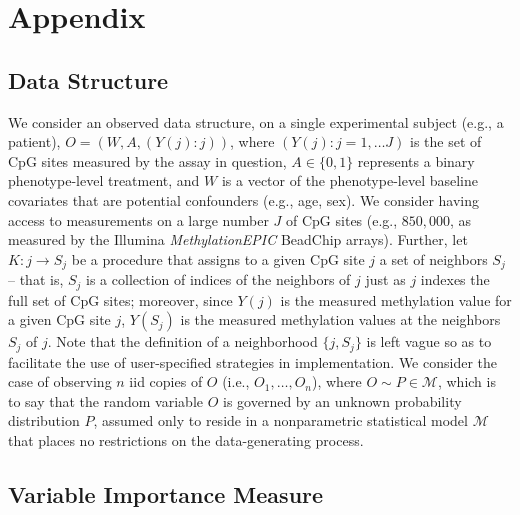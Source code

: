 \documentclass[9pt,a4paper,]{extarticle}
\theoremstyle{definition}
\theoremstyle{definition}
\theoremstyle{definition}
\theoremstyle{remark}
\begin{document}
\hypertarget{appendix}{%
\section{Appendix}\label{appendix}}

\hypertarget{data-structure}{%
\subsection{Data Structure}\label{data-structure}}

We consider an observed data structure, on a single experimental subject (e.g.,
a patient), \(O = (W, A, (Y(j) : j))\), where \((Y(j) : j = 1, \ldots J)\) is the
set of CpG sites measured by the assay in question, \(A \in \{0, 1\}\) represents
a binary phenotype-level treatment, and \(W\) is a vector of the phenotype-level
baseline covariates that are potential confounders (e.g., age, sex). We consider
having access to measurements on a large number \(J\) of CpG sites (e.g.,
\(850,000\), as measured by the Illumina \emph{MethylationEPIC} BeadChip arrays).
Further, let \(K: j \to S_j\) be a procedure that assigns to a given CpG site \(j\)
a set of neighbors \(S_j\) -- that is, \(S_j\) is a collection of indices of the
neighbors of \(j\) just as \(j\) indexes the full set of CpG sites; moreover, since
\(Y(j)\) is the measured methylation value for a given CpG site \(j\), \(Y(S_j)\) is
the measured methylation values at the neighbors \(S_j\) of \(j\). Note that the
definition of a neighborhood \(\{j, S_j\}\) is left vague so as to facilitate the
use of user-specified strategies in implementation. We consider the case of
observing \(n\) iid copies of \(O\) (i.e., \(O_1, \ldots, O_n\)), where \(O \sim P \in \mathcal{M}\), which is to say that the random variable \(O\) is governed by an
unknown probability distribution \(P\), assumed only to reside in a nonparametric
statistical model \(\mathcal{M}\) that places no restrictions on the
data-generating process.

\hypertarget{variable-importance-measure}{%
\subsection{Variable Importance Measure}\label{variable-importance-measure}}
\end{document}
